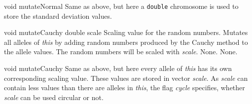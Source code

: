 \vspace*{4ex}

\setNormalInstance
\setCorrectWidthThree{8pt}
\printMethodWithParamsSaved
{void}
{}
{mutateNormal}
{Same as above, but here a {\tt double} chromosome is used to store
 the standard deviation values.}
{}
\setCorrectWidthThree{4pt}

\clearpage

\setNormalInstance
\printMethodWithOneParam
{void}
{mutateCauchy}
{double}
{scale}            
{Scaling value for the random numbers.}
{Mutates all alleles of {\em this} by adding random numbers
 produced by the Cauchy method to the allele values. The random
 numbers will be scaled with {\em scale}.}
{None.}
{None.}

\vspace*{4ex}

\setNormalInstance
\setCorrectWidthThree{8pt}
\printMethodWithParamsSaved
{void}
{}
{mutateCauchy}
{Same as above, but here every allele of {\em this} has its own
 corresponding scaling value. These values are stored in vector {\em scale}.
 As {\em scale} can contain less values than there are alleles in {\em this},
 the flag {\em cycle} specifies, whether {\em scale} can be used
 circular or not.} 
{}
\setCorrectWidthThree{4pt}

\vspace*{4ex}

